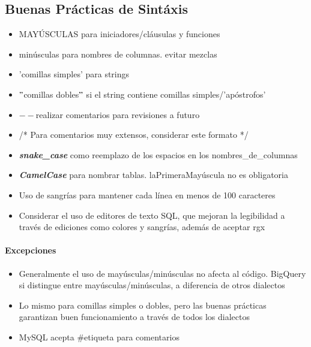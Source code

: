 \subsection{Buenas Prácticas de Sintáxis}
\begin{itemize}
    \item {MAYÚSCULAS para iniciadores/cláusulas y funciones}
    \item {minúsculas para nombres de columnas. evitar mezclas}
    \item {'comillas simples' para strings}
    \item {${"}$comillas dobles${"}$ si el string contiene comillas simples/'apóstrofos'}
    \item {${--}$realizar comentarios para revisiones a futuro}
    \item{/* Para comentarios muy extensos, considerar este formato */}
    \item {\textbf{\textit{snake\_case}} como reemplazo de los espacios en los nombres\_de\_columnas}
    \item {\textbf{\textit{CamelCase}} para nombrar tablas. laPrimeraMayúscula no es obligatoria}
    \item {Uso de sangrías para mantener cada línea en menos de 100 caracteres}
    \item {Considerar el uso de editores de texto SQL, que mejoran la legibilidad a través de ediciones como colores y sangrías, además de aceptar \gls{rgx}}
\end{itemize}

\paragraph{Excepciones}
\begin{itemize}
    \item {Generalmente el uso de mayúsculas/minúsculas no afecta al código. BigQuery si distingue entre mayúsculas/minúsculas, a diferencia de otros dialectos}
    \item {Lo mismo para comillas simples o dobles, pero las buenas prácticas garantizan buen funcionamiento a través de todos los dialectos}
    \item {MySQL acepta \#etiqueta para comentarios}
\end{itemize}

\newpage